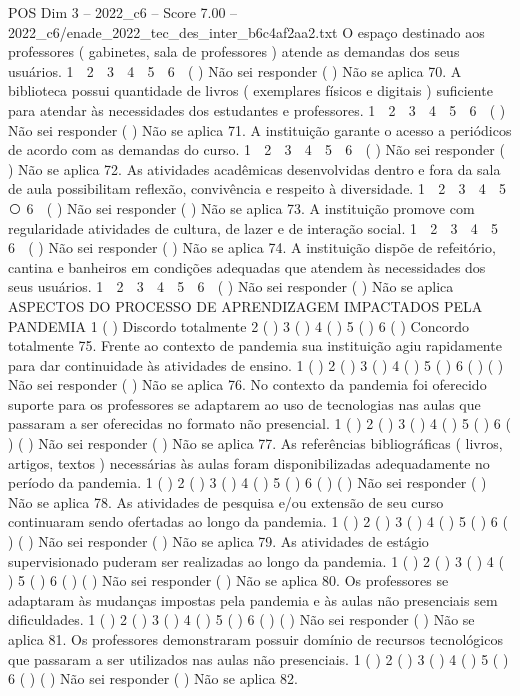 \begin{textsample}{POS Dim 3 – 2022\_c6 – Score 7.00 – 2022\_c6/enade\_2022\_tec\_des\_inter\_b6c4af2aa2.txt}
O espaço destinado aos professores ( gabinetes, sala de professores ) atende as demandas dos seus usuários. 1 ⃝ 2 ⃝ 3 ⃝ 4 ⃝ 5 ⃝ 6 ⃝ ( ) Não sei responder ( ) Não se aplica 70.
A biblioteca possui quantidade de livros ( exemplares físicos e digitais ) suficiente para atendar às necessidades dos estudantes e professores. 1 ⃝ 2 ⃝ 3 ⃝ 4 ⃝ 5 ⃝ 6 ⃝ ( ) Não sei responder ( ) Não se aplica 71.
A instituição garante o acesso a periódicos de acordo com as demandas do curso. 1 ⃝ 2 ⃝ 3 ⃝ 4 ⃝ 5 ⃝ 6 ⃝ ( ) Não sei responder ( ) Não se aplica 72.
As atividades acadêmicas desenvolvidas dentro e fora da sala de aula possibilitam reflexão, convivência e respeito à diversidade. 1 ⃝ 2 ⃝ 3 ⃝ 4 ⃝ 5 ⃝ 6 ⃝ ( ) Não sei responder ( ) Não se aplica 73.
A instituição promove com regularidade atividades de cultura, de lazer e de interação social. 1 ⃝ 2 ⃝ 3 ⃝ 4 ⃝ 5 ⃝ 6 ⃝ ( ) Não sei responder ( ) Não se aplica 74.
A instituição dispõe de refeitório, cantina e banheiros em condições adequadas que atendem às necessidades dos seus usuários. 1 ⃝ 2 ⃝ 3 ⃝ 4 ⃝ 5 ⃝ 6 ⃝ ( ) Não sei responder ( ) Não se aplica ASPECTOS DO PROCESSO DE APRENDIZAGEM IMPACTADOS PELA PANDEMIA 1 ( ) Discordo totalmente 2 ( ) 3 ( ) 4 ( ) 5 ( ) 6 ( ) Concordo totalmente 75.
Frente ao contexto de pandemia sua instituição agiu rapidamente para dar continuidade às atividades de ensino. 1 ( ) 2 ( ) 3 ( ) 4 ( ) 5 ( ) 6 ( ) ( ) Não sei responder ( ) Não se aplica 76.
No contexto da pandemia foi oferecido suporte para os professores se adaptarem ao uso de tecnologias nas aulas que passaram a ser oferecidas no formato não presencial. 1 ( ) 2 ( ) 3 ( ) 4 ( ) 5 ( ) 6 ( ) ( ) Não sei responder ( ) Não se aplica 77.
As referências bibliográficas ( livros, artigos, textos ) necessárias às aulas foram disponibilizadas adequadamente no período da pandemia. 1 ( ) 2 ( ) 3 ( ) 4 ( ) 5 ( ) 6 ( ) ( ) Não sei responder ( ) Não se aplica 78.
As atividades de pesquisa e/ou extensão de seu curso continuaram sendo ofertadas ao longo da pandemia. 1 ( ) 2 ( ) 3 ( ) 4 ( ) 5 ( ) 6 ( ) ( ) Não sei responder ( ) Não se aplica 79.
As atividades de estágio supervisionado puderam ser realizadas ao longo da pandemia. 1 ( ) 2 ( ) 3 ( ) 4 ( ) 5 ( ) 6 ( ) ( ) Não sei responder ( ) Não se aplica 80.
Os professores se adaptaram às mudanças impostas pela pandemia e às aulas não presenciais sem dificuldades. 1 ( ) 2 ( ) 3 ( ) 4 ( ) 5 ( ) 6 ( ) ( ) Não sei responder ( ) Não se aplica 81.
Os professores demonstraram possuir domínio de recursos tecnológicos que passaram a ser utilizados nas aulas não presenciais. 1 ( ) 2 ( ) 3 ( ) 4 ( ) 5 ( ) 6 ( ) ( ) Não sei responder ( ) Não se aplica 82.

\end{textsample}
